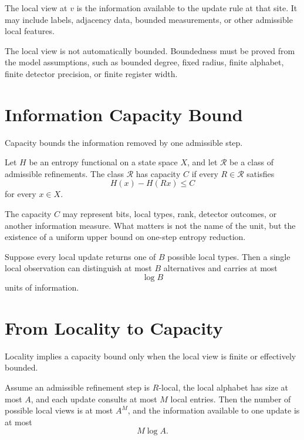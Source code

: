 \begin{definition}
The local view at \(v\) is the information available to the update rule at
that site. It may include labels, adjacency data, bounded measurements, or
other admissible local features.
\end{definition}

The local view is not automatically bounded. Boundedness must be proved from
the model assumptions, such as bounded degree, fixed radius, finite alphabet,
finite detector precision, or finite register width.

\section{Information Capacity Bound}

Capacity bounds the information removed by one admissible step.

\begin{definition}
Let \(H\) be an entropy functional on a state space \(X\), and let
\(\mathcal R\) be a class of admissible refinements. The class
\(\mathcal R\) has capacity \(C\) if every \(R\in\mathcal R\) satisfies
\[
H(x)-H(Rx)\le C
\]
for every \(x\in X\).
\end{definition}

The capacity \(C\) may represent bits, local types, rank, detector outcomes,
or another information measure. What matters is not the name of the unit, but
the existence of a uniform upper bound on one-step entropy reduction.

\begin{example}
Suppose every local update returns one of \(B\) possible local types. Then a
single local observation can distinguish at most \(B\) alternatives and carries
at most
\[
\log B
\]
units of information.
\end{example}

\section{From Locality to Capacity}

Locality implies a capacity bound only when the local view is finite or
effectively bounded.

\begin{theorem}
Assume an admissible refinement step is \(R\)-local, the local alphabet has
size at most \(A\), and each update consults at most \(M\) local entries. Then
the number of possible local views is at most \(A^M\), and the information
available to one update is at most
\[
M\log A.
\]
\end{theorem}

